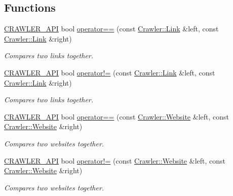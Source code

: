 \subsection*{Functions}
\begin{DoxyCompactItemize}
\item 
\hyperlink{_linker_8hpp_a6d4e3fff6f0294594417d2aa3530fb57}{C\+R\+A\+W\+L\+E\+R\+\_\+\+A\+P\+I} bool \hyperlink{namespace_crawler_ad2f4cb6dcb6244376bec77969769be43}{operator==} (const \hyperlink{class_crawler_1_1_link}{Crawler\+::\+Link} \&left, const \hyperlink{class_crawler_1_1_link}{Crawler\+::\+Link} \&right)
\begin{DoxyCompactList}\small\item\em Compares two links together. \end{DoxyCompactList}\item 
\hyperlink{_linker_8hpp_a6d4e3fff6f0294594417d2aa3530fb57}{C\+R\+A\+W\+L\+E\+R\+\_\+\+A\+P\+I} bool \hyperlink{namespace_crawler_a9b3b52cf15065a20a362fa1a750d3e4a}{operator!=} (const \hyperlink{class_crawler_1_1_link}{Crawler\+::\+Link} \&left, const \hyperlink{class_crawler_1_1_link}{Crawler\+::\+Link} \&right)
\begin{DoxyCompactList}\small\item\em Compares two links together. \end{DoxyCompactList}\item 
\hyperlink{_linker_8hpp_a6d4e3fff6f0294594417d2aa3530fb57}{C\+R\+A\+W\+L\+E\+R\+\_\+\+A\+P\+I} bool \hyperlink{namespace_crawler_a93aa1c0dfad41c40d35c40033f9284ff}{operator==} (const \hyperlink{class_crawler_1_1_website}{Crawler\+::\+Website} \&left, const \hyperlink{class_crawler_1_1_website}{Crawler\+::\+Website} \&right)
\begin{DoxyCompactList}\small\item\em Compares two websites together. \end{DoxyCompactList}\item 
\hyperlink{_linker_8hpp_a6d4e3fff6f0294594417d2aa3530fb57}{C\+R\+A\+W\+L\+E\+R\+\_\+\+A\+P\+I} bool \hyperlink{namespace_crawler_a7f80630220ca236fcb6afcca0f0cac6d}{operator!=} (const \hyperlink{class_crawler_1_1_website}{Crawler\+::\+Website} \&left, const \hyperlink{class_crawler_1_1_website}{Crawler\+::\+Website} \&right)
\begin{DoxyCompactList}\small\item\em Compares two websites together. \end{DoxyCompactList}\end{DoxyCompactItemize}


